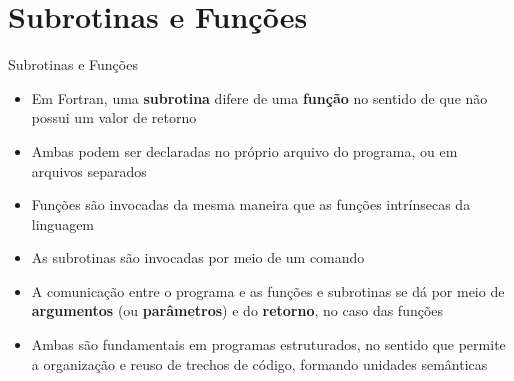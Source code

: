 \section{Subrotinas e Funções}

\begin{frame}[fragile]{Subrotinas e Funções}

    \begin{itemize}
        \item Em Fortran, uma \textbf{subrotina} difere de uma \textbf{função} no
            sentido de que não possui um valor de retorno

        \item Ambas podem ser declaradas no próprio arquivo do programa, ou em arquivos
            separados

        \item Funções são invocadas da mesma maneira que as funções intrínsecas da linguagem

        \item As subrotinas são invocadas por meio de um comando 

        \item A comunicação entre o programa e as funções e subrotinas se dá por meio de 
            \textbf{argumentos} (ou \textbf{parâmetros}) e do \textbf{retorno}, no caso
            das funções

        \item Ambas são fundamentais em programas estruturados, no sentido que permite a
            organização e reuso de trechos de código, formando unidades semânticas
    \end{itemize}

\end{frame}

